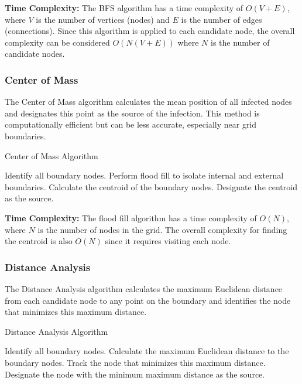 \textbf{Time Complexity:} The BFS algorithm has a time complexity of \(O(V + E)\), where \(V\) is the number of vertices (nodes) and \(E\) is the number of edges (connections). Since this algorithm is applied to each candidate node, the overall complexity can be considered \(O(N(V + E))\) where \(N\) is the number of candidate nodes.

\subsubsection{Center of Mass}
The Center of Mass algorithm calculates the mean position of all infected nodes and designates this point as the source of the infection. This method is computationally efficient but can be less accurate, especially near grid boundaries.

\begin{algorithm}
\caption{Center of Mass Algorithm}
\begin{algorithmic}[1]
\STATE Identify all boundary nodes.
\STATE Perform flood fill to isolate internal and external boundaries.
\STATE Calculate the centroid of the boundary nodes.
\STATE Designate the centroid as the source.
\end{algorithmic}
\end{algorithm}

\textbf{Time Complexity:} The flood fill algorithm has a time complexity of \(O(N)\), where \(N\) is the number of nodes in the grid. The overall complexity for finding the centroid is also \(O(N)\) since it requires visiting each node.

\subsubsection{Distance Analysis}
The Distance Analysis algorithm calculates the maximum Euclidean distance from each candidate node to any point on the boundary and identifies the node that minimizes this maximum distance.

\begin{algorithm}
\caption{Distance Analysis Algorithm}
\begin{algorithmic}[1]
\STATE Identify all boundary nodes.
    \STATE Calculate the maximum Euclidean distance to the boundary nodes.
    \STATE Track the node that minimizes this maximum distance.
\ENDFOR
\STATE Designate the node with the minimum maximum distance as the source.
\end{algorithmic}
\end{algorithm}

